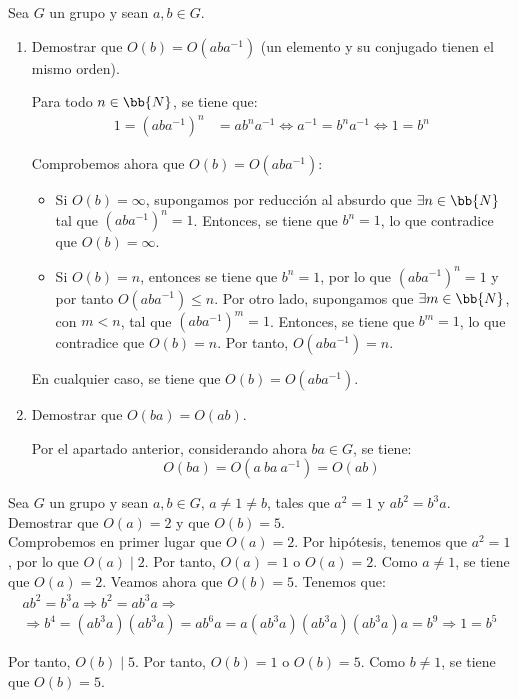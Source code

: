 \begin{ejercicio}\label{ej:2.33}
    Sea $G$ un grupo y sean $a, b \in G$.
    \begin{enumerate}
        \item Demostrar que $O(b) = O(aba^{-1})$ (un elemento y su conjugado tienen el mismo orden).
        
        Para todo $n\in \bb{N}$, se tiene que:
        \begin{align*}
            1=(aba^{-1})^n&=ab^n a^{-1}\iff a^{-1}=b^n a^{-1}\iff 1=b^n
        \end{align*}

        Comprobemos ahora que $O(b)=O(aba^{-1})$:
        \begin{itemize}
            \item Si $O(b)=\infty$, supongamos por reducción al absurdo que $\exists n\in \bb{N}$ tal que $(aba^{-1})^n=1$. Entonces, se tiene que $b^n=1$, lo que contradice que $O(b)=\infty$.
            
            \item Si $O(b)=n$, entonces se tiene que $b^n=1$, por lo que $(aba^{-1})^n=1$ y por tanto $O(aba^{-1})\leq n$. Por otro lado, supongamos que $\exists m\in \bb{N}$, con $m<n$, tal que $(aba^{-1})^m=1$. Entonces, se tiene que $b^m=1$, lo que contradice que $O(b)=n$. Por tanto, $O(aba^{-1})=n$.
        \end{itemize}

        En cualquier caso, se tiene que $O(b)=O(aba^{-1})$.
        \item Demostrar que $O(ba) = O(ab)$.
        
        Por el apartado anterior, considerando ahora $ba\in G$, se tiene:
        \begin{equation*}
            O(ba) = O(a\ ba\ a^{-1}) = O(ab)
        \end{equation*}
    \end{enumerate}
\end{ejercicio}

\begin{ejercicio}\label{ej:2.34}
    Sea $G$ un grupo y sean $a, b \in G$, $a \neq 1 \neq b$, tales que $a^2 = 1$ y $ab^2 = b^3a$. Demostrar que $O(a) = 2$ y que $O(b) = 5$.\\

    Comprobemos en primer lugar que $O(a)=2$. Por hipótesis, tenemos que $a^2=1$, por lo que $O(a)\mid 2$. Por tanto, $O(a)=1$ o $O(a)=2$. Como $a\neq 1$, se tiene que $O(a)=2$. Veamos ahora que $O(b)=5$. Tenemos que:
    \begin{multline*}
        ab^2 = b^3a
        \Longrightarrow
        b^2=ab^3a
        \Longrightarrow \\ \Longrightarrow
        b^4=(ab^3a)(ab^3a)=ab^6a=a(ab^3a)(ab^3a)(ab^3a)a
        =b^9\Longrightarrow 1=b^5
    \end{multline*}

    Por tanto, $O(b)\mid 5$. Por tanto, $O(b)=1$ o $O(b)=5$. Como $b\neq 1$, se tiene que $O(b)=5$.
\end{ejercicio}

